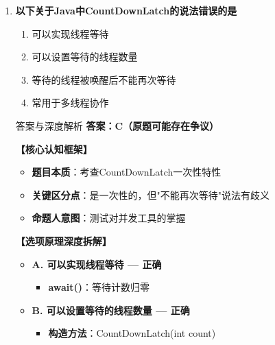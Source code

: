\documentclass[12pt, a4paper]{ctexart}
\begin{document}
\begin{enumerate}[label=\textbf{\arabic*.}]
\begin{bluebox}{答案与深度解析}
		      \textbf{【命题趋势与实战策略】}

		      \textbf{考场秒杀技巧}：Array/Linked/Priority都是BlockingQueue实现
	      \end{bluebox}

	\item \textbf{以下关于Java中CountDownLatch的说法错误的是}
	      \begin{enumerate}[label=\Alph*.]
		      \item 可以实现线程等待
		      \item 可以设置等待的线程数量
		      \item 等待的线程被唤醒后不能再次等待
		      \item 常用于多线程协作
	      \end{enumerate}

	      \begin{bluebox}{答案与深度解析}
		      \textbf{答案：C（原题可能存在争议）}

		      \textbf{【核心认知框架】}
		      \begin{itemize}[label={}, leftmargin=*, nosep]
			      \item \textbf{题目本质}：考查CountDownLatch一次性特性
			      \item \textbf{关键区分点}：是一次性的，但"不能再次等待"说法有歧义
			      \item \textbf{命题人意图}：测试对并发工具的掌握
		      \end{itemize}

		      \textbf{【选项原理深度拆解】}
					  \begin{itemize}[label={}, leftmargin=*, nosep]

		      \item \textbf{A. 可以实现线程等待 — 正确}
		      \begin{itemize}[label={}, leftmargin=*, nosep]
			      \item \textbf{await()}：等待计数归零
		      \end{itemize}

		      \item \textbf{B. 可以设置等待的线程数量 — 正确}
		      \begin{itemize}[label={}, leftmargin=*, nosep]
			      \item \textbf{构造方法}：CountDownLatch(int count)
		      \end{itemize}


\end{itemize}
\end{bluebox}
\end{enumerate}
\end{document}
